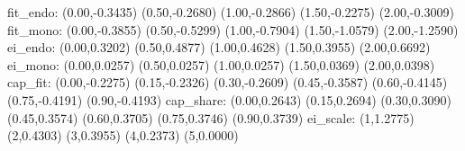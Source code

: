 fit_endo: (0.00,-0.3435) (0.50,-0.2680) (1.00,-0.2866) (1.50,-0.2275) (2.00,-0.3009)
fit_mono: (0.00,-0.3855) (0.50,-0.5299) (1.00,-0.7904) (1.50,-1.0579) (2.00,-1.2590)
ei_endo:  (0.00,0.3202) (0.50,0.4877) (1.00,0.4628) (1.50,0.3955) (2.00,0.6692)
ei_mono:  (0.00,0.0257) (0.50,0.0257) (1.00,0.0257) (1.50,0.0369) (2.00,0.0398)
cap_fit:   (0.00,-0.2275) (0.15,-0.2326) (0.30,-0.2609) (0.45,-0.3587) (0.60,-0.4145) (0.75,-0.4191) (0.90,-0.4193)
cap_share: (0.00,0.2643) (0.15,0.2694) (0.30,0.3090) (0.45,0.3574) (0.60,0.3705) (0.75,0.3746) (0.90,0.3739)
ei_scale: (1,1.2775) (2,0.4303) (3,0.3955) (4,0.2373) (5,0.0000)
